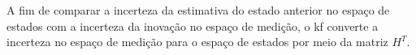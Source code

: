 \documentclass[acronym, symbols, table, deposito]{fei}
\begin{document}
				A fim de comparar a incerteza da estimativa do estado anterior no espaço de estados com a incerteza da inovação no espaço de medição, o \acrshort{kf} converte a incerteza no espaço de medição para o espaço de estados por meio da matriz $H^T$.
				
%				
%			
%				
%			
%				
				
\end{document}
